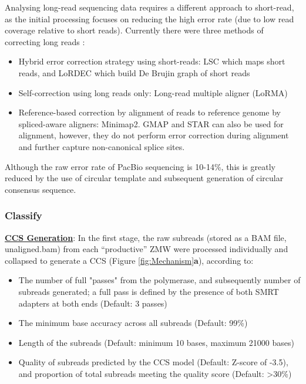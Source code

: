 Analysing long-read sequencing data requires a different approach to short-read, as the initial processing focuses on reducing the high error rate (due to low read coverage relative to short reads). Currently there were three methods of correcting long reads \cite{Zhao2019}: 
\begin{itemize}
	\item Hybrid error correction strategy using short-reads: LSC \cite{Au2012} which maps short reads, and LoRDEC which build De Brujin graph of short reads \cite{Salmela2014}
	\item Self-correction using long reads only: Long-read multiple aligner (LoRMA) \cite{Salmela2017}
	\item Reference-based correction by alignment of reads to reference genome by spliced-aware aligners: Minimap2. GMAP and STAR can also be used for alignment, however, they do not perform error correction during alignment and further capture non-canonical splice sites.  
\end{itemize}

Although the raw error rate of PacBio sequencing is 10-14\%, this is greatly reduced by the use of circular template and subsequent generation of circular consensus sequence. 

\subsubsection{Classify}
\label{section:classify}

\uline{\textbf{CCS Generation}}: In the first stage, the raw subreads (stored as a BAM file, unaligned.bam) from each “productive” ZMW were processed individually and collapsed to generate a CCS (Figure \cref{fig:Mechanism}\textbf{a}), according to: 
\begin{itemize}
	\item The number of full "passes" from the polymerase, and subsequently number of subreads generated; a full pass is defined by the presence of both SMRT adapters at both ends (Default: 3 passes)
	\item The minimum base accuracy across all subreads (Default: 99\%)
	\item Length of the subreads (Default: minimum 10 bases, maximum 21000 bases)
	\item Quality of subreads predicted by the CCS model (Default: Z-score of -3.5), and proportion of total subreads meeting the quality score (Default: \textgreater 30\%)
\end{itemize}

